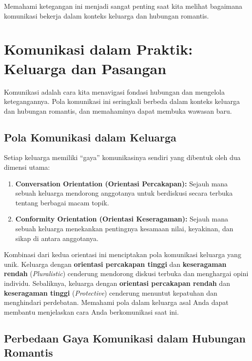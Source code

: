 \documentclass[
  letterpaper,
  DIV=11,
  numbers=noendperiod]{scrreprt}
\providecommand{\tightlist}{%
  \setlength{\itemsep}{0pt}\setlength{\parskip}{0pt}}
\begin{document}
Memahami ketegangan ini menjadi sangat penting saat kita melihat
bagaimana komunikasi bekerja dalam konteks keluarga dan hubungan
romantis.

\section{Komunikasi dalam Praktik: Keluarga dan
Pasangan}\label{komunikasi-dalam-praktik-keluarga-dan-pasangan}

Komunikasi adalah cara kita menavigasi fondasi hubungan dan mengelola
ketegangannya. Pola komunikasi ini seringkali berbeda dalam konteks
keluarga dan hubungan romantis, dan memahaminya dapat membuka wawasan
baru.

\subsection{Pola Komunikasi dalam
Keluarga}\label{pola-komunikasi-dalam-keluarga}

Setiap keluarga memiliki ``gaya'' komunikasinya sendiri yang dibentuk
oleh dua dimensi utama:

\begin{enumerate}
\def\labelenumi{\arabic{enumi}.}
\tightlist
\item
  \textbf{Conversation Orientation (Orientasi Percakapan):} Sejauh mana
  sebuah keluarga mendorong anggotanya untuk berdiskusi secara terbuka
  tentang berbagai macam topik.
\item
  \textbf{Conformity Orientation (Orientasi Keseragaman):} Sejauh mana
  sebuah keluarga menekankan pentingnya kesamaan nilai, keyakinan, dan
  sikap di antara anggotanya.
\end{enumerate}

Kombinasi dari kedua orientasi ini menciptakan pola komunikasi keluarga
yang unik. Keluarga dengan \textbf{orientasi percakapan tinggi} dan
\textbf{keseragaman rendah} (\emph{Pluralistic}) cenderung mendorong
diskusi terbuka dan menghargai opini individu. Sebaliknya, keluarga
dengan \textbf{orientasi percakapan rendah} dan \textbf{keseragaman
tinggi} (\emph{Protective}) cenderung menuntut kepatuhan dan menghindari
perdebatan. Memahami pola dalam keluarga asal Anda dapat membantu
menjelaskan cara Anda berkomunikasi saat ini.

\subsection{Perbedaan Gaya Komunikasi dalam Hubungan
Romantis}\label{perbedaan-gaya-komunikasi-dalam-hubungan-romantis}
\end{document}
